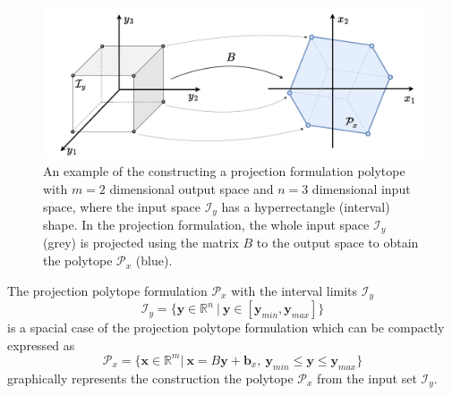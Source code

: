 \begin{figure}
    \centering
    \includegraphics[width=0.8\linewidth]{Chapters/imgs/projection.pdf}
    \caption{An example of the constructing a projection formulation polytope with $m=2$ dimensional output space and $n=3$ dimensional input space, where the input space $\mathcal{I}_y$ has a hyperrectangle (interval) shape. In the projection formulation, the whole input space $\mathcal{I}_y$ (grey) is projected using the matrix $B$ to the output space to obtain the polytope $\mathcal{P}_x$ (blue). }
    \label{fig:proj}
\end{figure}

The projection polytope formulation $\mathcal{P}_x$ with the interval limits $\mathcal{I}_y$
\begin{equation}
    \mathcal{I}_y = \{ \bm{y}\in\mathbb{R}^n ~|~ \bm{y}\in[\bm{y}_{min},\bm{y}_{max}]\}
\end{equation}
is a spacial case of the projection polytope formulation which can be compactly expressed as
\begin{equation}
    \mathcal{P}_x=\{\bm{x}\in\mathbb{R}^m |~ \bm{x} = B\bm{y} + \bm{b}_x,~\bm{y}_{min} \leq  \bm{y} \leq \bm{y}_{max}  \}
    \label{eq:proj_hyp}
\end{equation}
 graphically represents the construction the polytope $\mathcal{P}_x$ from the input set $\mathcal{I}_y$.

